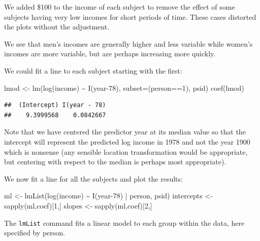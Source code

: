 \documentclass[
  ignorenonframetext,
]{beamer}
\newenvironment{Shaded}{\begin{snugshade}}{\end{snugshade}}
\newcommand{\AttributeTok}[1]{\textcolor[rgb]{0.77,0.63,0.00}{#1}}
\newcommand{\DecValTok}[1]{\textcolor[rgb]{0.00,0.00,0.81}{#1}}
\newcommand{\FunctionTok}[1]{\textcolor[rgb]{0.00,0.00,0.00}{#1}}
\newcommand{\NormalTok}[1]{#1}
\newcommand{\OtherTok}[1]{\textcolor[rgb]{0.56,0.35,0.01}{#1}}
\newcommand{\SpecialCharTok}[1]{\textcolor[rgb]{0.00,0.00,0.00}{#1}}
\begin{document}
\begin{frame}[fragile]{}
\protect\hypertarget{section-21}{}
We added \$100 to the income of each subject to remove the effect of
some subjects having very low incomes for short periods of time. These
cases distorted the plots without the adjustment.

We see that men's incomes are generally higher and less variable while
women's incomes are more variable, but are perhaps increasing more
quickly.

We could fit a line to each subject starting with the first:

\vspace{12pt}
\small

\begin{Shaded}
\begin{Highlighting}[]
\NormalTok{lmod }\OtherTok{\textless{}{-}} \FunctionTok{lm}\NormalTok{(}\FunctionTok{log}\NormalTok{(income) }\SpecialCharTok{\textasciitilde{}} \FunctionTok{I}\NormalTok{(year}\DecValTok{{-}78}\NormalTok{), }\AttributeTok{subset=}\NormalTok{(person}\SpecialCharTok{==}\DecValTok{1}\NormalTok{), psid)}
\FunctionTok{coef}\NormalTok{(lmod)}
\end{Highlighting}
\end{Shaded}

\begin{verbatim}
##  (Intercept) I(year - 78) 
##    9.3999568    0.0842667
\end{verbatim}
\end{frame}

\begin{frame}[fragile]{}
\protect\hypertarget{section-22}{}
Note that we have centered the predictor year at its median value so
that the intercept will represent the predicted log income in 1978 and
not the year 1900 which is nonsense (any sensible location
transformation would be appropriate, but centering with respect to the
median is perhaps most appropriate).

We now fit a line for all the subjects and plot the results:

\vspace{12pt}
\small

\begin{Shaded}
\begin{Highlighting}[]
\NormalTok{ml }\OtherTok{\textless{}{-}} \FunctionTok{lmList}\NormalTok{(}\FunctionTok{log}\NormalTok{(income) }\SpecialCharTok{\textasciitilde{}} \FunctionTok{I}\NormalTok{(year}\DecValTok{{-}78}\NormalTok{) }\SpecialCharTok{|}\NormalTok{ person, psid)}
\NormalTok{intercepts }\OtherTok{\textless{}{-}} \FunctionTok{sapply}\NormalTok{(ml,coef)[}\DecValTok{1}\NormalTok{,]}
\NormalTok{slopes }\OtherTok{\textless{}{-}} \FunctionTok{sapply}\NormalTok{(ml,coef)[}\DecValTok{2}\NormalTok{,]}
\end{Highlighting}
\end{Shaded}

\vspace{12pt}
\normalsize

The \texttt{lmList} command fits a linear model to each group within the
data, here specified by person.
\end{frame}
\end{document}
